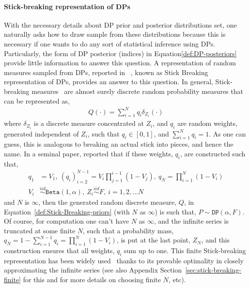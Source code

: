 \documentclass[10pt]{article}
\newcommand{\DP}{\texttt{DP}}
\begin{document}
\paragraph{Stick-breaking representation of DPs} With the necessary details about DP prior and posterior distributions set, one naturally asks how to draw sample from these distributions because this is necessary if one wants to do any sort of statistical inference using DPs. Particularly, the form of DP posterior (indices) in Equation\ref{def:DP-posteriors} provide little information to answer this question. A representation of random measures sampled from DPs, reported in ~\citep{sethuraman1994constructive}, known as Stick Breaking representation of DPs, provides an answer to this question. 
In general, Stick-breaking measures~\citep{ishwaran2001gibbs} are almost surely discrete random probability measures that can be represented as,
\begin{align}\label{def:Stick-Breaking-priors}
{Q}(\cdot) = \sum_{i=1}^{N}q_{i}\delta_{Z_{i}}(\cdot)
\end{align}
where $\delta_{Z_{i}}$ is a discrete measure concentrated at $Z_{i}$, and $q_{i}$  are random weights, generated independent of $Z_{i}$, such that $q_{i}\in [0,1]$, and $\sum_{i=1}^{N}q_{i} = 1$. As one can guess, this is analogous to breaking an actual stick into pieces, and hence the name. In a seminal paper,  \cite{sethuraman1994constructive} reported  that if these weights, $q_{i}$, are constructed  such that,
\begin{align} 
\label{def:SB-DP}
q_{1}&= V_{1}, \: (q_{i})_{i=2}^{N-1}= V_{i}\prod_{j=1}^{i-1}(1-V_{j}), \: q_{N}= \prod_{i=1}^{N}(1-V_{i})\\ \label{def:SB-DP-3}
V_{i}& \stackrel{iid}{\sim}\texttt{Beta}(1,\alpha), \: Z_{i} \stackrel{iid}{\sim} F,\: i=1,2,...N
\end{align} 
and $N$ is $\infty$, then the generated random discrete measure, $Q$, in Equation~\ref{def:Stick-Breaking-priors} (with $N$ as $\infty$) is such that, $P \sim \DP(\alpha,F)$. Of course, for computation one can't have $N$ as $\infty$, and the infinite series is truncated at some finite $N$, such that a probability mass, $q_{N} = 1 - \sum_{i=1}^{N-1} q_{i} = \prod_{i=1}^{N}(1-V_{i})$, is put at the last point, $Z_{N}$, and this construction ensures that all weights, $q_{i}$ sum up to one.  This finite Stick-breaking representation has been widely used~\citep{ishwaran2001gibbs,muliere1998approximating} thanks to its provable optimality in closely approximating the infinite series (see also Appendix Section~\ref{sec:stick-breaking-finite} for this and for more details on choosing finite $N$, etc).
\end{document}
